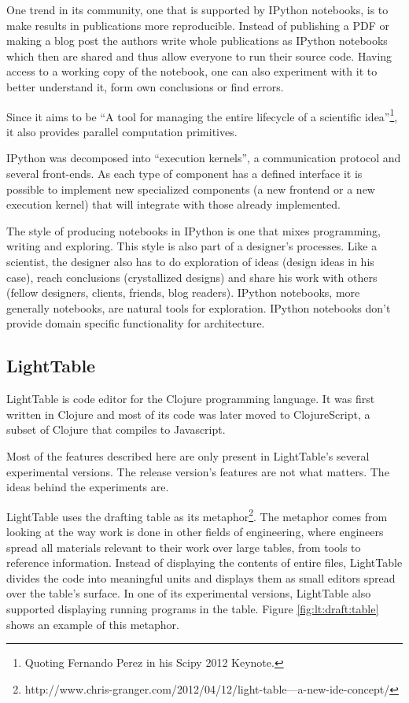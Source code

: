 \documentclass{./llncs2e/llncs}
\begin{document}
	One trend in its community, one that is supported by IPython notebooks, is to make results in publications more reproducible. 
	Instead of publishing a PDF or making a blog post the authors write whole publications as IPython notebooks which then are shared and thus allow everyone to run their source code. 
	Having access to a working copy of the notebook, one can also experiment with it to better understand it, form own conclusions or find errors.

	Since it aims to be ``A tool for managing the entire lifecycle of a scientific idea''\footnote{Quoting Fernando Perez in his Scipy 2012 Keynote.}, it also provides parallel computation primitives.

	IPython was decomposed into ``execution kernels'', a communication protocol and several front-ends. 
	As each type of component has a defined interface it is possible to implement new specialized components (a new frontend or a new execution kernel) that will integrate with those already implemented.

	The style of producing notebooks in IPython is one that mixes programming, writing and exploring. 
	This style is also part of a designer's processes. 
	Like a scientist, the designer also has to do exploration of ideas (design ideas in his case), reach conclusions (crystallized designs) and share his work with others (fellow designers, clients, friends, blog readers). 
	IPython notebooks, more generally notebooks, are natural tools for exploration.
	IPython notebooks don't provide domain specific functionality for architecture.

\subsection{LightTable}
	LightTable is code editor for the Clojure programming language\cite{hickey2008clojure}. 
	It was first written in Clojure and most of its code was later moved to ClojureScript\cite{10.1109/MIC.2011.148}, a subset of Clojure that compiles to Javascript.

	Most of the features described here are only present in LightTable's several experimental versions. 
	The release version's features are not what matters. 
	The ideas behind the experiments are.

	LightTable uses the drafting table as its metaphor\footnote{http://www.chris-granger.com/2012/04/12/light-table---a-new-ide-concept/}. 
	The metaphor comes from looking at the way work is done in other fields of engineering, where engineers spread all materials relevant to their work over large tables, from tools to reference information. 
	Instead of displaying the contents of entire files, LightTable divides the code into meaningful units and displays them as small editors spread over the table's surface. 
	In one of its experimental versions, LightTable also supported displaying running programs in the table. 
	Figure \ref{fig:lt:draft:table} shows an example of this metaphor.
\end{document}

